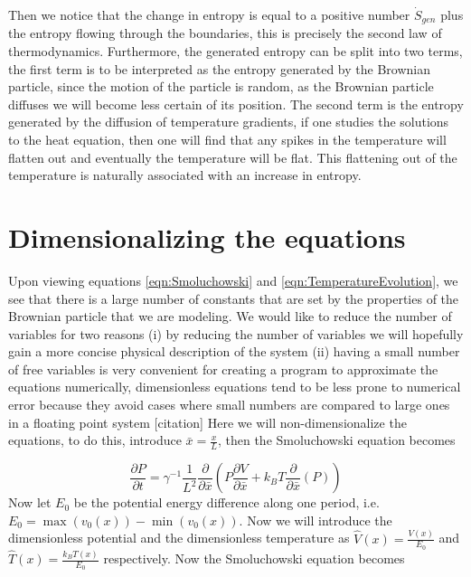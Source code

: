 Then we notice that the change in entropy is equal to a positive number $\dot{S}_{gen}$ plus the entropy flowing through the boundaries, this is precisely the second law of thermodynamics. Furthermore, the generated entropy can be split into two terms, the first term is to be interpreted as the entropy generated by the Brownian particle, since the motion of the particle is random, as the Brownian particle diffuses we will become less certain of its position. The second term is the entropy generated by the diffusion of temperature gradients, if one studies the solutions to the heat equation, then one will find that any spikes in the temperature will flatten out and eventually the temperature will be flat. This flattening out of the temperature is naturally associated with an increase in entropy.
\section{Dimensionalizing the equations}

Upon viewing equations \ref{eqn:Smoluchowski} and \ref{eqn:TemperatureEvolution}, we see that there is a large number of constants that are set by the properties of the Brownian particle that we are modeling. We would like to reduce the number of variables for two reasons (i) by reducing the number of variables we will hopefully gain a more concise physical description of the system (ii) having a small number of free variables is very convenient for creating a program to approximate the equations numerically, dimensionless equations tend to be less prone to numerical error because they avoid cases where small numbers are compared to large ones in a floating point system {\color{red} [citation]}
Here we will non-dimensionalize the equations, to do this, introduce $\bar{x} = \frac{x}{L}$, then the Smoluchowski equation becomes

\begin{equation}
\frac{\partial P}{\partial t} = \gamma^{-1}\frac{1}{L^2} \frac{\partial}{\partial \bar{x}} \left (P \frac{\partial V}{\partial \bar{x}} + k_B T \frac{\partial}{\partial \bar{x}}(P) \right )
\end{equation}
Now let $E_0$ be the potential energy difference along one period, i.e. $E_0 = \max(v_0(x)) - \min(v_0(x))$. Now we will introduce the dimensionless potential and the dimensionless temperature as $\hat{V}(x) = \frac{V(x)}{E_0}$ and $\hat{T}(x) = \frac{k_B T(x)}{E_0}$ respectively. Now the Smoluchowski equation becomes

